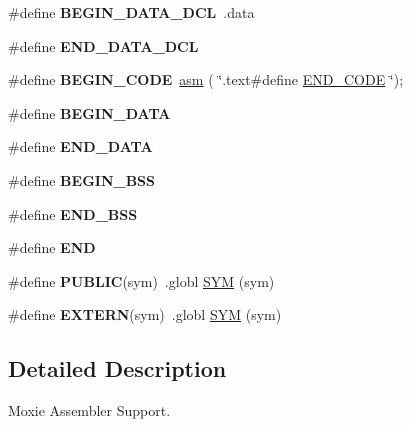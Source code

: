 \begin{DoxyCompactItemize}
\#define {\bfseries B\+E\+G\+I\+N\+\_\+\+D\+A\+T\+A\+\_\+\+D\+CL}~.data
\item 
\mbox{\label{group__RTEMSScoreCPUMoxieASM_gaba5951c6a7df52e7c13d07a6823e9758}} 
\#define {\bfseries E\+N\+D\+\_\+\+D\+A\+T\+A\+\_\+\+D\+CL}
\item 
\mbox{\label{group__RTEMSScoreCPUMoxieASM_ga6d6dc213aff5b736968e2aff37eb2c99}} 
\#define {\bfseries B\+E\+G\+I\+N\+\_\+\+C\+O\+DE}~\mbox{\hyperlink{group__RTEMSScoreCPUExample_ga04cbac6d343a5c80b8e4547131c6bfcd}{asm}} ( \char`\"{}.text\#define \mbox{\hyperlink{group__RTEMSScoreCPUx86-64ASM_gaac423acb743520558daf6a94e1e34534}{E\+N\+D\+\_\+\+C\+O\+DE}} \char`\"{});
\item 
\mbox{\label{group__RTEMSScoreCPUMoxieASM_ga93fba2b033eb50ec004405c59faaa824}} 
\#define {\bfseries B\+E\+G\+I\+N\+\_\+\+D\+A\+TA}
\item 
\mbox{\label{group__RTEMSScoreCPUMoxieASM_gab989978585b78e98ff314e8abb5f9bb0}} 
\#define {\bfseries E\+N\+D\+\_\+\+D\+A\+TA}
\item 
\mbox{\label{group__RTEMSScoreCPUMoxieASM_ga50f110f0489e48ceda4a0473a35d2978}} 
\#define {\bfseries B\+E\+G\+I\+N\+\_\+\+B\+SS}
\item 
\mbox{\label{group__RTEMSScoreCPUMoxieASM_gae8acdd1ba8aa625ce8a829773fd512e2}} 
\#define {\bfseries E\+N\+D\+\_\+\+B\+SS}
\item 
\mbox{\label{group__RTEMSScoreCPUMoxieASM_ga29fd18bed01c4d836c7ebfe73a125c3f}} 
\#define {\bfseries E\+ND}
\item 
\mbox{\label{group__RTEMSScoreCPUMoxieASM_ga5e536c0e80cb78da6a74541281111e40}} 
\#define {\bfseries P\+U\+B\+L\+IC}(sym)~.globl \mbox{\hyperlink{group__RTEMSScoreCPUx86-64ASM_gafe05d428a5f345f51fb591debb815325}{S\+YM}} (sym)
\item 
\mbox{\label{group__RTEMSScoreCPUMoxieASM_ga9808b867f8d1bd54d78548a5cd5dc415}} 
\#define {\bfseries E\+X\+T\+E\+RN}(sym)~.globl \mbox{\hyperlink{group__RTEMSScoreCPUx86-64ASM_gafe05d428a5f345f51fb591debb815325}{S\+YM}} (sym)
\end{DoxyCompactItemize}


\subsection{Detailed Description}
Moxie Assembler Support. 

